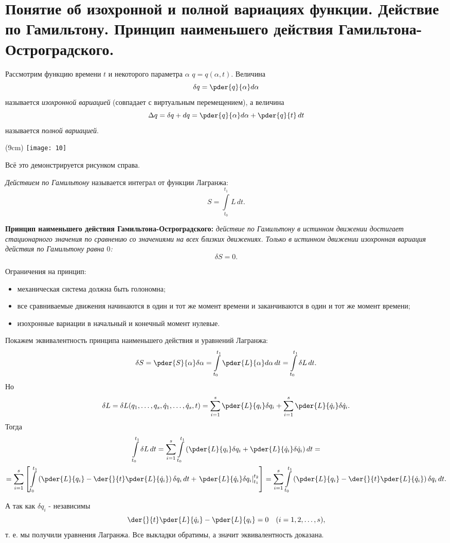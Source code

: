 \chapter{Понятие об изохронной и полной вариациях функции. Действие по
Гамильтону. Принцип наименьшего действия Гамильтона-Остроградского.}

Рассмотрим функцию времени \( t \) и некоторого параметра \( \alpha \)
\( q=q(\alpha, t) \). Величина 
\[
    \delta q= \pder{q}{\alpha} d\alpha
\]
называется \textit{изохронной вариацией} (совпадает с виртуальным перемещением),
а величина
\[
    \Delta q= \delta q + d q = \pder{q}{\alpha} d\alpha + \pder{q}{t}\,dt
\]
называется \textit{полной вариацией}.


\sidefig(9cm)
{\texttt{[image: 10]}}
{Всё это демонстрируется рисунком справа.

\textit{Действием по Гамильтону} называется интеграл от функции Лагранжа:
\[
        S = \int\limits_{t_0}^{t_1} L\,dt.
\]
}   
\textbf{Принцип наименьшего действия Гамильтона-Остроградского:} \emph{действие
по Гамильтону в истинном движении достигает стационарного значения по сравнению
со значениями на всех близких движениях. Только в истинном движении изохронная
вариация действия по Гамильтону равна \( 0 \):}
\[
    \delta S = 0.
\]

Ограничения на принцип:
\begin{itemize}
\item механическая система должна быть голономна;
\item все сравниваемые движения начинаются в один и тот же момент времени и
    заканчиваются в один и тот же момент времени;
\item изохронные вариации в начальный и конечный момент нулевые.
\end{itemize}

Покажем эквивалентность принципа наименьшего действия и уравнений Лагранжа:
\[
    \delta S =
    \pder{S}{\alpha}\delta\alpha =
    \int\limits_{t_0}^{t_1} \pder{L}{\alpha} d\alpha\,dt =
    \int\limits_{t_0}^{t_1} \delta{L}\,dt.
\]
Но 
\[
    \delta{L} =
    \delta{L}(q_1,\dots,q_s, \dot{q}_1, \dots,  \dot{q}_s, t) =
    \sum\limits_{i=1}^s 
    \pder{L}{q_i}\delta q_i
    +
    \sum\limits_{i=1}^s 
    \pder{L}{\dot{q}_i}\delta\dot{q}_i.
\]
Тогда 
\begin{gather*}
    \int\limits_{t_0}^{t_1} \delta{L}\,dt=
    \sum\limits_{i=1}^s
    \int\limits_{t_0}^{t_1}
    \left(
    \pder{L}{q_i} \delta q_i+
    \pder{L}{\dot{q}_i} \delta  \dot{q}_i
    \right)dt = \\ =
    \sum\limits_{i=1}^s
    \left[
    \int\limits_{t_0}^{t_1}
    \left(
    \pder{L}{q_i} -
    \der{}{t}\pder{L}{\dot{q}_i} 
    \right)\delta  {q}_i\,dt
    +
    \left.  
    \pder{L}{\dot{q}_i} \delta  {q}_i  
    \right|_{t_1}^{t_2}
    \right] =
    \sum\limits_{i=1}^s
    \int\limits_{t_0}^{t_1}
    \left(
    \pder{L}{q_i} -
    \der{}{t}\pder{L}{\dot{q}_i} 
    \right)\delta  {q}_i\,dt.
\end{gather*}

А так как \( \delta q_i \) - независимы
\[
    \der{}{t}\pder{L}{\dot{q}_i} - \pder{L}{q_i} = 0 \quad (i=1,2,\dots,s),
\]  
т. е. мы получили уравнения Лагранжа. Все выкладки обратимы, а значит
эквивалентность доказана. 

\newpage
